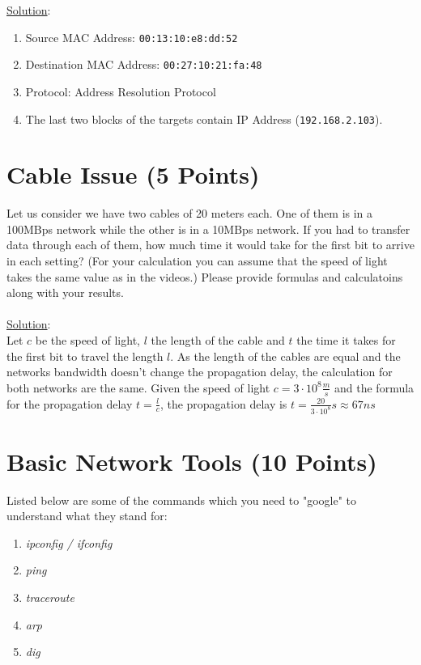 \documentclass{WeSTassignment}
\begin{document}
\underline{Solution}: 
\begin{enumerate}
	\item Source MAC Address: \texttt{00:13:10:e8:dd:52}
	\item Destination MAC Address: \texttt{00:27:10:21:fa:48}
	\item Protocol: Address Resolution Protocol 
	\item The last two blocks of the targets contain IP Address (\texttt{192.168.2.103}).
\end{enumerate}


\section{Cable Issue (5 Points)}

Let us consider we have two cables of 20 meters each. One of them is in a 100MBps network while the other is in a 10MBps network. If you had to transfer data through each of them, how much time it would take for the first bit to arrive in each setting? (For your calculation you can assume that the speed of light takes the same value as in the videos.) Please provide formulas and calculatoins along with your results. \\
\\
\underline{Solution}: 
\\
Let $c$ be the speed of light, $l$ the length of the cable and $t$ the time it takes for the first bit to travel the length $l$. 
As the length of the cables are equal and the networks bandwidth doesn't change the propagation delay, the calculation for both networks are the same.  
Given the speed of light $c = 3 \cdot 10^8 \frac{m}{s}$ and the formula for the propagation delay $t = \frac{l}{c}$, the propagation delay is $t = \frac{20}{3 \cdot 10^8}s \approx 67ns$



\section{Basic Network Tools (10 Points)}

Listed below are some of the commands which you need to "google" to understand what they stand for:
\begin{enumerate}
\item \emph{ipconfig / ifconfig}
\item \emph{ping}
\item \emph{traceroute}
\item \emph{arp}
\item \emph{dig}
\end{enumerate}
\end{document}
